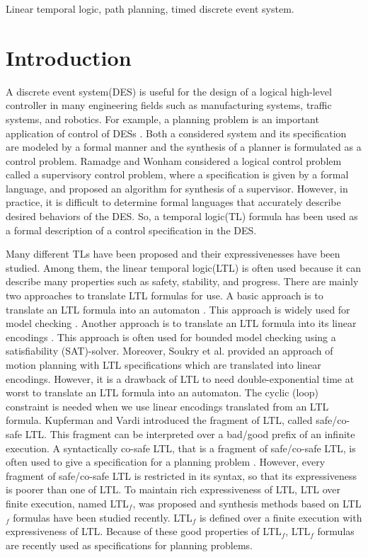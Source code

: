 \documentclass[journal,twoside,web]{IEEEtran}
\begin{document}
\begin{IEEEkeywords}
Linear temporal logic, path planning, timed discrete event system.
\end{IEEEkeywords}
%
\section{Introduction}
%
%
%
A discrete event system(DES) is useful for the design of a logical high-level controller in many engineering fields such as manufacturing systems, traffic systems, and robotics\cite{CL2008,CSX2018,SSS2013}.
%
For example, a planning problem is an important application of control of DESs \cite{ghallab2016automated}.  Both a considered system and its specification are modeled by a formal manner and the synthesis of a planner is formulated as a control problem.  
Ramadge and Wonham \cite{ramadge1987supervisory} considered a logical control problem called a supervisory control problem, where a specification is given by a formal language, and proposed an algorithm for synthesis of a supervisor.
%
%
However, in practice, it is difficult to determine formal languages that accurately describe desired behaviors of the DES.
So, a temporal logic(TL) formula has been used as a formal description of a control specification in the DES\cite{TW1986,JK2006,SU2018}.

%
Many different TLs have been proposed and their expressivenesses have been studied. 
Among them, the linear temporal logic(LTL) is often used because it can describe many properties such as safety, stability, and progress.
There are mainly two approaches to translate LTL formulas for use.
A basic approach is to translate an LTL formula into an automaton \cite{GV1999}. This approach is widely used for model checking \cite{BK2008}.
Another approach is to translate an LTL formula into its linear encodings \cite{BHJLS2006}. This approach is often used for bounded model checking using a satisfiability (SAT)-solver. 
Moreover, Soukry et al.\cite{S2016} provided an approach of motion planning with LTL specifications which are translated into linear encodings.
%
However, it is a drawback of LTL to need double-exponential time at worst to translate an LTL formula into an automaton.
The cyclic (loop) constraint is needed when we use linear encodings translated from an LTL formula\cite{sahin2019multirobot}. 
Kupferman and Vardi \cite{kupferman2001model} introduced the fragment of LTL, called safe/co-safe LTL. 
This fragment can be interpreted over a bad/good prefix of an infinite execution.
A syntactically co-safe LTL, that is a fragment of safe/co-safe LTL, is often used to give a specification for a planning problem \cite{cho2017cost,feyzabadi2016multi}.
%
However, every fragment of safe/co-safe LTL is restricted in its syntax, so that its expressiveness is poorer than one of LTL.  
To maintain rich expressiveness of LTL, LTL over finite execution, named LTL$_f$, was proposed and synthesis methods based on LTL$_f$ formulas have been studied recently\cite{Zhu2017,li2019sat}.
LTL$_f$ is defined over a finite execution with expressiveness of LTL.
Because of these good properties of LTL$_f$, LTL$_f$ formulas are recently used as specifications for planning problems\cite{camacho2019strong}.
\end{document}
